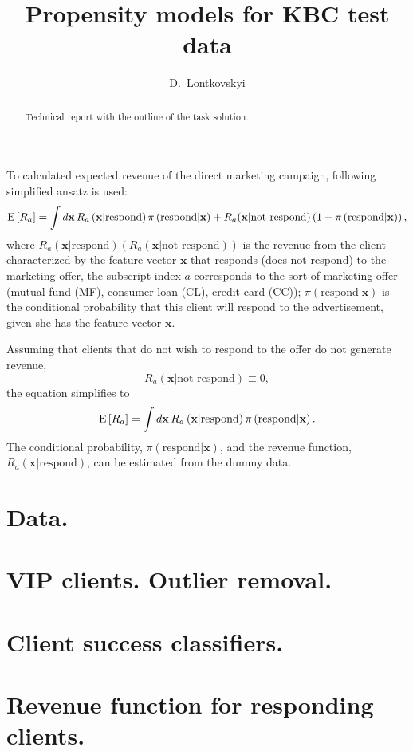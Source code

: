 \documentclass[14pt]{scrartcl}
\title{Propensity models for KBC test data}
\author{D.~Lontkovskyi}
\begin{document}
\maketitle

\begin{abstract}
Technical report with the outline of the task solution.
\end{abstract}

To calculated expected revenue of the direct marketing campaign, following simplified ansatz is used:
\begin{equation}
    \textmd{E}\left[R_a\right] =  \int d\mathbf{x}\,R_a \left( \textbf{x}|\textrm{respond} \right) \pi\left(\textrm{respond}|\textbf{x}\right) + 
                                                    R_a(\textbf{x}|\textrm{not respond}) \left(1 - \pi\left(\textrm{respond}|\textbf{x}\right) \right),
\end{equation}
where $R_a \left( \textbf{x}|\textrm{respond} \right) \left(R_a \left( \textbf{x}|\textrm{not respond} \right)\right)$ is the revenue from the client characterized
by the feature vector $\textbf{x}$ that responds (does not respond) to the marketing offer, the subscript index $a$ corresponds to the sort of marketing offer (mutual fund (MF), consumer loan (CL), credit card (CC)); $\pi\left(\textrm{respond}|\textbf{x}\right)$ is the conditional probability that 
this client will respond to the advertisement, given she has the feature vector $\textbf{x}$.

Assuming that clients that do not wish to respond to the offer do not generate revenue, 
\begin{equation}
    R_a(\textbf{x}|\textrm{not respond}) \equiv 0,
\end{equation} 
the equation simplifies to
\begin{equation}
    \textmd{E}\left[R_a\right] =  \int d\mathbf{x}\,R_a \left( \textbf{x}|\textrm{respond} \right) \pi\left(\textrm{respond}|\textbf{x}\right).
\end{equation}
The conditional probability, $\pi\left(\textrm{respond}|\textbf{x}\right)$, and the revenue function, $R_a \left( \textbf{x}|\textrm{respond} \right)$, can be estimated from the dummy data.

\section{Data.}
\section{VIP clients. Outlier removal.}
\section{Client success classifiers.}
\section{Revenue function for responding clients.}
\end{document}

